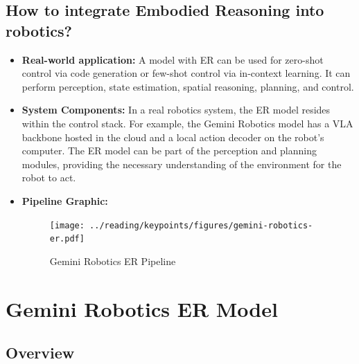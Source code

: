 \documentclass[12pt,a4paper]{article}
\begin{document}
\subsection{How to integrate Embodied Reasoning into robotics?}

\begin{itemize}
    \item \textbf{Real-world application:} A model with ER can be used for zero-shot control via code generation or few-shot control via in-context learning. It can perform perception, state estimation, spatial reasoning, planning, and control.

    \item \textbf{System Components:} In a real robotics system, the ER model resides within the control stack. For example, the Gemini Robotics model has a VLA backbone hosted in the cloud and a local action decoder on the robot's computer. The ER model can be part of the perception and planning modules, providing the necessary understanding of the environment for the robot to act.

    \item \textbf{Pipeline Graphic:}

    \begin{figure}[h]
        \centering
        \texttt{[image: ../reading/keypoints/figures/gemini-robotics-er.pdf]}
        \caption{Gemini Robotics ER Pipeline}
        \label{fig:gemini-robotics-er-pipeline}
    \end{figure}
\end{itemize}

\section{Gemini Robotics ER Model}

\subsection{Overview}
\end{document}
